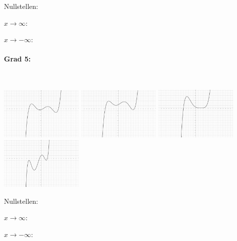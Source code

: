 \documentclass[12pt, parskip=half, a4paper, oneside]{scrartcl}
\begin{document}
\begin{addmargin}[-2cm]{0pt}
Nullstellen:

$x\rightarrow\infty:$

$x\rightarrow-\infty:$
\end{addmargin}

\paragraph{Grad 5:}\textcolor{white}{.}

\includegraphics[width=4cm]{Bilder/G51}\hfill
\includegraphics[width=4cm]{Bilder/G52}\hfill
\includegraphics[width=4cm]{Bilder/G53}\hfill
\includegraphics[width=4cm]{Bilder/G54}

\begin{addmargin}[-2cm]{0pt}
Nullstellen:

$x\rightarrow\infty:$

$x\rightarrow-\infty:$
\end{addmargin}
\end{document}
